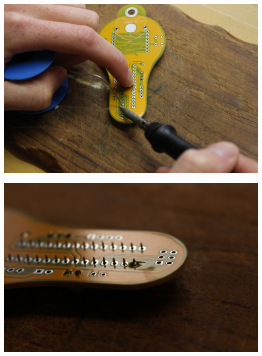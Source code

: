 \documentclass{article}
\begin{document}
\vspace{0.5cm}

\begin{minipage}[b]{0.5\textwidth}
	\includegraphics[width=\textwidth]{Bilder/IMG_5555.JPG}
\end{minipage}
\begin{minipage}[b]{0.5\textwidth}
	\includegraphics[width=\textwidth]{Bilder/IMG_5558.JPG}
\end{minipage}

\vspace{0.5cm}
\end{document}
